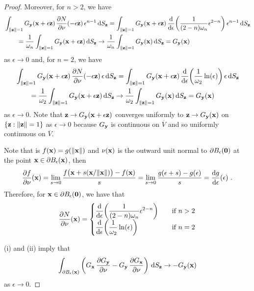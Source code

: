 \begin{proof}
Moreover, for $n>2$, we have
\begin{align*}
&\int_{\|\mathbf{z}\|=1}
G_{\mathbf{y}}(\mathbf{x}+\epsilon \mathbf{z})
\,\frac{\partial{N}}{\partial \mathbf{\nu}}(-\epsilon \mathbf{z}) \, \epsilon^{n-1}\,\mathrm{d}{S}_{\mathbf{z}}
= \int_{\|\mathbf{z}\|=1} G_{\mathbf{y}}(\mathbf{x}+\epsilon \mathbf{z})
\,\frac{\mathrm{d}}{\mathrm{d}{\epsilon}}{ \left(\frac{1}{(2-n)\omega_n} \epsilon^{2-n}\right) }
\, \epsilon^{n-1}\,\mathrm{d}{S}_{\mathbf{z}} \\
&\qquad = \frac{1}{\omega_n} \int_{\|\mathbf{z}\|=1}
G_{\mathbf{y}}(\mathbf{x}+\epsilon \mathbf{z}) \,\mathrm{d}{S}_{\mathbf{z}}
\to 
\frac{1}{\omega_n} \int_{\|\mathbf{z}\|=1} G_{\mathbf{y}}(\mathbf{x}) \,\mathrm{d}{S}_{\mathbf{z}}
= G_{\mathbf{y}}(\mathbf{x})
\end{align*}
as $\epsilon \to 0$ and, for $n=2$, we have
\begin{align*}
&\int_{\|\mathbf{z}\|=1}
G_{\mathbf{y}}(\mathbf{x}+\epsilon \mathbf{z})
\,\frac{\partial{N}}{\partial \mathbf{\nu}}(-\epsilon \mathbf{z}) \, \epsilon \,\mathrm{d}{S}_{\mathbf{z}}
= \int_{\|\mathbf{z}\|=1} G_{\mathbf{y}}(\mathbf{x}+\epsilon \mathbf{z})
\,\frac{\mathrm{d}}{\mathrm{d}{\epsilon}}{ \left(\frac{1}{\omega_2} \ln(\epsilon) \right) }
\, \epsilon \,\mathrm{d}{S}_{\mathbf{z}} \\
& \qquad = \frac{1}{\omega_2} \int_{\|\mathbf{z}\|=1}
G_{\mathbf{y}}(\mathbf{x}+\epsilon \mathbf{z}) \,\mathrm{d}{S}_{\mathbf{z}}
\to
\frac{1}{\omega_2} \int_{\|\mathbf{z}\|=1} G_{\mathbf{y}}(\mathbf{x}) \,\mathrm{d}{S}_{\mathbf{z}}
= G_{\mathbf{y}}(\mathbf{x})
\end{align*}
as $\epsilon \to 0$.
Note that $\mathbf{z} \to G_{\mathbf{y}}(\mathbf{x}+\epsilon \mathbf{z})$
converges uniformly to $\mathbf{z} \to G_{\mathbf{y}}(\mathbf{x})$ on
$\{ \mathbf{z} : \|\mathbf{z}\| = 1\}$ as $\epsilon \to 0$ because
$G_{\mathbf{y}}$ is continuous on $\overline{V}$ and so uniformly continuous
on $\overline{V}$.

Note that is $f(\mathbf{x}) = g(\|\mathbf{x}\|)$ and $\mathbf{\nu}(\mathbf{x})$ is
the outward unit normal to $\partial B_\epsilon(\mathbf{0})$ at the point
$\mathbf{x} \in \partial B_\epsilon(\mathbf{x})$, then
\[
\frac{\partial{f}}{\partial \mathbf{\nu}}(\mathbf{x}) = \lim_{s\to 0}
\frac{f\big(\mathbf{x} + s(\mathbf{x}/\|\mathbf{x}\|)\big) - f(\mathbf{x})}{s}
= \lim_{s\to 0} \frac{g(\epsilon + s) - g(\epsilon)}{s}
= \frac{\mathrm{d}g}{\mathrm{d}{\epsilon}}(\epsilon) \ .
\]
Therefore, for $\mathbf{x} \in \partial B_\epsilon(\mathbf{0})$, we have
that
\[
\frac{\partial{N}}{\partial \mathbf{\nu}}(\mathbf{x})
= \begin{cases}
\displaystyle
\frac{\mathrm{d}}{\mathrm{d}{\epsilon}}{ \left(\frac{1}{(2-n)\omega_n} \epsilon^{2-n}\right) }
& \quad \text{if} \ n>2 \\
\displaystyle
\frac{\mathrm{d}}{\mathrm{d}{\epsilon}}{ \left(\frac{1}{\omega_2} \ln(\epsilon) \right) }
&\quad \text{if} \ n = 2
\end{cases}
\]

(i) and (ii) imply that 
\begin{equation} \label{laplace_GequG_two_A}
\int_{\partial B_{\epsilon}(\mathbf{x})}
\left( G_{\mathbf{x}}\,\frac{\partial{G_{\mathbf{y}}}}{\partial \mathbf{\nu}} 
- G_{\mathbf{y}}\,\frac{\partial{G_{\mathbf{x}}}}{\partial \mathbf{\nu}} \right) \,\mathrm{d}{S}_{\mathbf{z}}
\to -G_{\mathbf{y}}(\mathbf{x})
\end{equation}
as $\epsilon \to 0$.


\end{proof}
